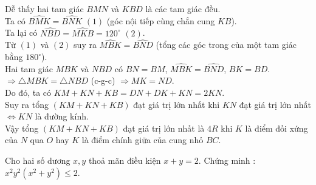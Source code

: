 \begin{ex}
{\begin{enumerate}
				Dễ thấy hai tam giác $BMN$ và $KBD$ là các tam giác đều.\\
				Ta có $\widehat{BMK} = \widehat{BNK}$ $(1)$ (góc nội tiếp cùng chắn cung $KB$).\\
				Ta lại có $\widehat{NBD} = \widehat{MKB} = 120^\circ$ $(2)$.\\
				Từ $(1)$ và $(2)$ suy ra $\widehat{MBK} = \widehat{BND}$ (tổng các góc trong của một tam giác bằng $180^\circ$).\\
				Hai tam giác $MBK$ và $NBD$ có $BN = BM$, $\widehat{MBK} = \widehat{BND}$, $BK = BD$.\\
				$\Rightarrow \triangle MBK = \triangle NBD$ (c-g-c) $\Rightarrow MK = ND$.\\
				Do đó, ta có $KM+KN+KB = DN + DK + KN = 2KN$.\\
				Suy ra tổng $(KM+KN+KB)$ đạt giá trị lớn nhất khi $KN$ đạt giá trị lớn nhất $\Leftrightarrow KN$ là đường kính.\\
				Vậy tổng $(KM+KN+KB)$ đạt giá trị lớn nhất là $4R$ khi $K$ là điểm đối xứng của $N$ qua $O$ hay $K$ là điểm chính giữa của cung nhỏ $BC$.
	\end{enumerate}
}
\end{ex}

\begin{ex}%
Cho hai số dương $x, y$ thoả mãn điều kiện $x+y =2$. Chứng minh : $x^2y^2(x^2+y^2) \le 2$.
\end{ex}
